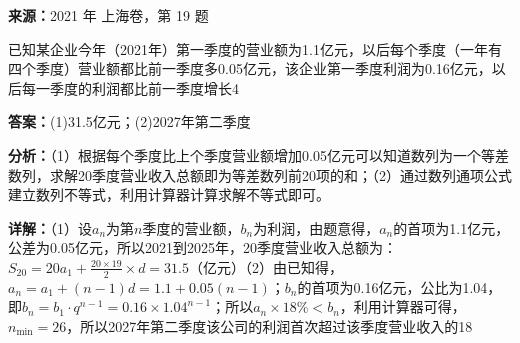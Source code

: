 \begin{question}[points=14]
\textbf{来源：}2021 年 上海卷，第 19 题\par
已知某企业今年（2021年）第一季度的营业额为1.1亿元，以后每个季度（一年有四个季度）营业额都比前一季度多0.05亿元，该企业第一季度利润为0.16亿元，以后每一季度的利润都比前一季度增长4%
\begin{solution}
\textbf{答案：}(1)31.5亿元；(2)2027年第二季度

\textbf{分析：}（1）根据每个季度比上个季度营业额增加0.05亿元可以知道数列为一个等差数列，求解20季度营业收入总额即为等差数列前20项的和；（2）通过数列通项公式建立数列不等式，利用计算器计算求解不等式即可。

\textbf{详解：}（1）设$a_n$为第$n$季度的营业额，$b_n$为利润，由题意得，$a_n$的首项为1.1亿元，公差为0.05亿元，所以2021到2025年，20季度营业收入总额为：$S_{20}=20a_1+\frac{20\times19}{2}\times d=31.5$（亿元）（2）由已知得，$a_n=a_1+(n-1)d=1.1+0.05(n-1)$；$b_n$的首项为0.16亿元，公比为1.04，即$b_n=b_1\cdot q^{n-1}=0.16\times1.04^{n-1}$；所以$a_n\times18\%<b_n$，利用计算器可得，$n_{\min}=26$，所以2027年第二季度该公司的利润首次超过该季度营业收入的18%
\end{solution}
\end{question}

